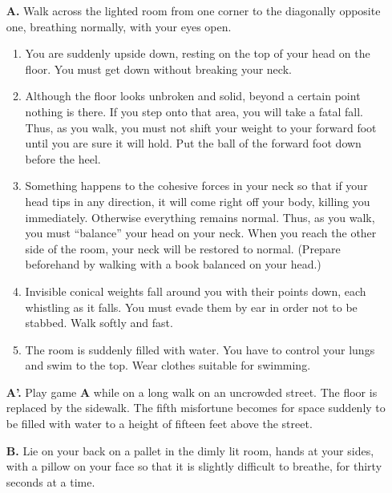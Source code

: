 \begin{itemize}[label={}. wide, nosep, itemsep=0.5em]
	\item[\textbf{A.}] Walk across the lighted room from one corner to the diagonally 
opposite one, breathing normally, with your eyes open. 
\lilskip
\begin{enumerate}[label=\arabic*., nosep, itemsep=0.5em]
\item You are suddenly upside down, resting on the top of your head on the 
floor. You must get down without breaking your neck. 

\item Although the floor looks unbroken and solid, beyond a certain point 
nothing is there. If you step onto that area, you will take a fatal fall. Thus, as 
you walk, you must not shift your weight to your forward foot until you are 
sure it will hold. Put the ball of the forward foot down before the heel. 

\item Something happens to the cohesive forces in your neck so that if your 
head tips in any direction, it will come right off your body, killing you 
immediately. Otherwise everything remains normal. Thus, as you walk, you 
must \enquote{balance} your head on your neck. When you reach the other side of 
the room, your neck will be restored to normal. (Prepare beforehand by 
walking with a book balanced on your head.) 

\item Invisible conical weights fall around you with their points down, each 
whistling as it falls. You must evade them by ear in order not to be stabbed. 
Walk softly and fast. 

\item The room is suddenly filled with water. You have to control your lungs 
and swim to the top. Wear clothes suitable for swimming. 
\end{enumerate}

\item[\textbf{A'.}] Play game \textbf{A} while on a long walk on an uncrowded street. The floor 
is replaced by the sidewalk. The fifth misfortune becomes for space suddenly 
to be filled with water to a height of fifteen feet above the street. 

\item[\textbf{B.}] Lie on your back on a pallet in the dimly lit room, hands at your 
sides, with a pillow on your face so that it is slightly difficult to breathe, for 
thirty seconds at a time. 


\end{itemize}

